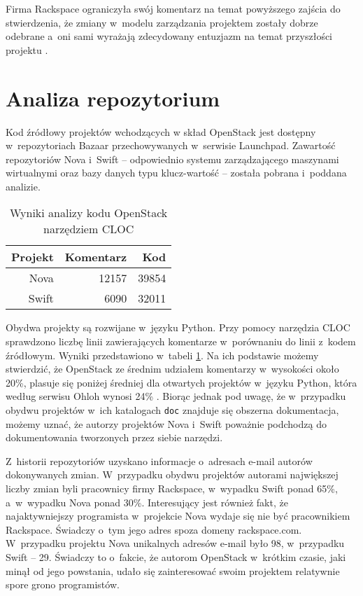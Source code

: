 \documentclass[a4paper,12pt]{article}
\begin{document}
	Firma Rackspace ograniczyła swój komentarz na temat powyższego zajścia do
	stwierdzenia, że zmiany w~modelu zarządzania projektem zostały dobrze
	odebrane a~oni sami wyrażają zdecydowany entuzjazm na temat przyszłości
	projektu \cite{concerns_about_openness}.

	\section{Analiza repozytorium}

	Kod źródłowy projektów wchodzących w skład OpenStack jest dostępny
	w~repozytoriach Bazaar przechowywanych w~serwisie Launchpad. Zawartość
	repozytoriów Nova i~Swift -- odpowiednio systemu zarządzającego maszynami
	wirtualnymi oraz bazy danych typu klucz-wartość -- została pobrana i~poddana
	analizie.

	\begin{table}
		\centering
		\begin{tabular}{|r|r|r|}
			\hline
			\bf Projekt & \bf Komentarz & \phantom{asdf} \bf Kod \\
			\hline
			Nova & 12157 & 39854 \\
			Swift & 6090 & 32011 \\
			\hline
		\end{tabular}
		\caption{Wyniki analizy kodu OpenStack narzędziem CLOC}
		\label{tab:cloc}
	\end{table}

	Obydwa projekty są rozwijane w~języku Python. Przy pomocy narzędzia CLOC
	\cite{cloc} sprawdzono liczbę linii zawierających komentarze w~porównaniu do
	linii z~kodem źródłowym. Wyniki przedstawiono w~tabeli \ref{tab:cloc}.
	Na ich podstawie możemy stwierdzić, że OpenStack ze średnim udziałem
	komentarzy w~wysokości około 20\%, plasuje się poniżej średniej dla
	otwartych projektów w~języku Python, która według serwisu Ohloh wynosi 24\%
	\cite{ohloh_python_stats}. Biorąc jednak pod uwagę, że w~przypadku obydwu
	projektów w~ich katalogach \texttt{doc} znajduje się obszerna dokumentacja,
	możemy uznać, że autorzy projektów Nova i~Swift poważnie podchodzą do
	dokumentowania tworzonych przez siebie narzędzi.

	Z~historii repozytoriów uzyskano informacje o~adresach e-mail autorów
	dokonywanych zmian. W~przypadku obydwu projektów autorami największej liczby
	zmian byli pracownicy firmy Rackspace, w~wypadku Swift ponad 65\%,
	a~w~wypadku Nova ponad 30\%. Interesujący jest również fakt, że
	najaktywniejszy programista w~projekcie Nova wydaje się nie być pracownikiem
	Rackspace. Świadczy o~tym jego adres spoza domeny rackspace.com.
	W~przypadku projektu Nova unikalnych adresów e-mail było 98, w~przypadku
	Swift -- 29. Świadczy to o~fakcie, że autorom OpenStack w~krótkim
	czasie, jaki minął od jego powstania, udało się zainteresować swoim
	projektem relatywnie spore grono programistów.

	
	
\end{document}
